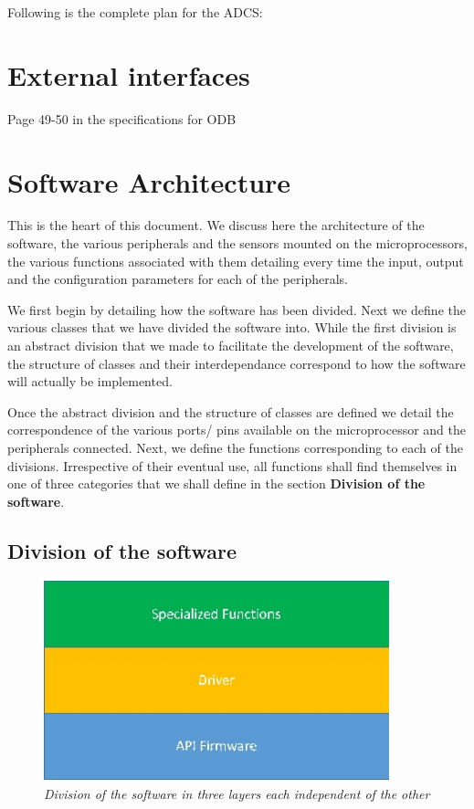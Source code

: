 \documentclass[11pt,a4paper]{report}
\begin{document}
Following is the complete plan for the ADCS: 



\chapter{External interfaces} \thispagestyle{fancy}

Page 49-50 in the specifications for ODB 
\chapter{Software Architecture} \thispagestyle{fancy}
This is the heart of this document. We discuss here the architecture of the software, the various peripherals and the sensors mounted on the microprocessors, the various functions associated with them detailing every time the input, output and the configuration parameters for each of the peripherals. 

We first begin by detailing how the software has been divided. Next we define the various classes that we have divided the software into. While the first division is an abstract division that we made to facilitate the development of the software, the structure of classes and their interdependance correspond to how the software will actually be implemented. 

Once the abstract division and the structure of classes are defined we detail the correspondence of the various ports/ pins available on the microprocessor and the peripherals connected. Next, we define the functions corresponding to each of the divisions. Irrespective of their eventual use, all functions shall find themselves in one of three categories that we shall define in the section \textbf{Division of the software}. 


\section{Division of the software} 

\begin{figure}[!h]
\centering 
\includegraphics[width=10cm]{arch_layers.jpg}
\caption{\textit{Division of the software in three layers each independent of the other}}
\label{layers_arch_soft}
\end{figure}
 
\end{document}
